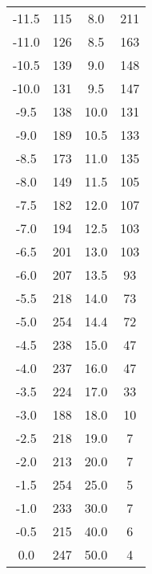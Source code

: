 \begin{table}
\begin{tabular}{c c || c c}
            -11.5  &      115   &   8.0       &     211   \\      
            -11.0    &      126   &   8.5     &     163   \\   
            -10.5  &      139   &   9.0       &     148   \\      
            -10.0    &      131   &   9.5     &     147   \\   
            -9.5   &      138   &   10.0      &     131   \\      
            -9.0     &      189   &   10.5    &     133   \\      
            -8.5   &      173   &   11.0      &     135   \\      
            -8.0     &      149   &   11.5    &     105   \\      
            -7.5   &      182   &   12.0      &     107   \\      
            -7.0     &      194   &   12.5    &     103   \\      
            -6.5   &      201   &   13.0      &     103   \\      
            -6.0     &      207   &   13.5    &     93    \\     
            -5.5   &      218   &   14.0      &     73    \\     
            -5.0     &      254   &   14.4    &     72    \\     
            -4.5   &      238   &   15.0      &     47    \\     
            -4.0     &      237   &   16.0      &     47    \\     
            -3.5   &      224   &   17.0     &     33    \\     
            -3.0     &      188   &   18.0      &     10    \\     
            -2.5   &      218   &   19.0      &     7     \\    
            -2.0     &      213   &   20.0      &     7     \\    
            -1.5   &      254   &   25.0      &     5     \\    
            -1.0     &      233   &   30.0      &     7     \\    
            -0.5   &      215   &   40.0      &     6     \\    
            0.0      &      247   &   50.0      &     4     \\      
    \end{tabular}
\end{table}
 
